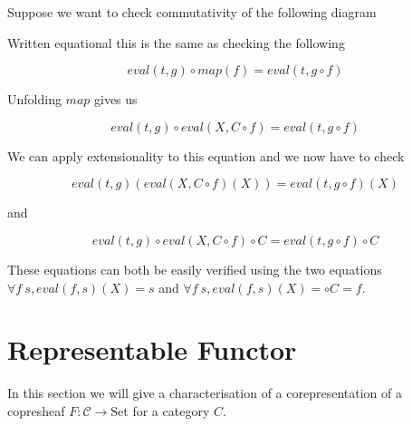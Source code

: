 \documentclass[12pt]{article} %
\theoremstyle{definition}
\theoremstyle{definition}
\theoremstyle{definition}
\theoremstyle{definition}
\begin{document}
Suppose we want to check commutativity of the following diagram \newline

Written equational this is the same as checking the following

\begin{equation}
  eval(t, g) \circ map(f) = eval(t, g \circ f)
\end{equation}

Unfolding $map$ gives us 

\begin{equation}
  eval(t, g) \circ eval(X, C \circ f) = eval(t, g \circ f)
\end{equation}

We can apply extensionality to this equation and we now have to check

\begin{equation}
  eval(t, g) (eval(X, C \circ f)(X)) = eval(t, g \circ f)(X)
\end{equation}

and

\begin{equation}
  eval(t, g) \circ eval(X, C \circ f) \circ C = eval(t, g \circ f) \circ C
\end{equation}

These equations can both be easily verified using the two equations
$\forall f\ s, eval(f, s)(X) = s$ and 
$\forall f \ s,eval(f, s)(X) = \circ C = f$.


\section{Representable Functor}

In this section we will give a characterisation of a corepresentation
of a copresheaf $F : \mathcal{C} \to \text{Set}$ for a category $C$.
\end{document}
